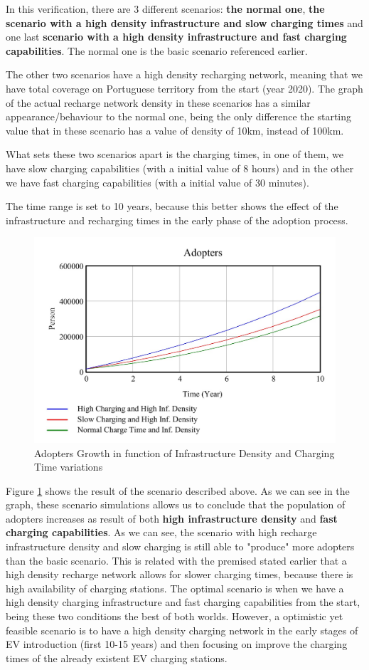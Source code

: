 In this verification, there are 3 different scenarios: \textbf{the normal one}, \textbf{the scenario with a high density infrastructure and slow charging times} and one last \textbf{scenario with a high density infrastructure and fast charging capabilities}. The normal one is the basic scenario referenced earlier.

The other two scenarios have a high density recharging network, meaning that we have total coverage on Portuguese territory from the start (year 2020). The graph of the actual recharge network density in these scenarios has a similar appearance/behaviour to the normal one, being the only difference the starting value that in these scenario has a value of density of 10km, instead of 100km.

What sets these two scenarios apart is the charging times, in one of them, we have slow charging capabilities (with a initial value of 8 hours) and in the other we have fast charging capabilities (with a initial value of 30 minutes).

The time range is set to 10 years, because this better shows the effect of the infrastructure and recharging times in the early phase of the adoption process.

\begin{figure}[htbp]
\centerline{\includegraphics[width=0.7\linewidth]{img/results-time-and-density.jpg}}
\caption{Adopters Growth in function of Infrastructure Density and Charging Time variations}
\label{fig:results-time-and-density}
\end{figure}

Figure \ref{fig:results-time-and-density} shows the result of the scenario described above. As we can see in the graph, these scenario simulations allows us to conclude that the population of adopters increases as result of both \textbf{high infrastructure density} and \textbf{fast charging capabilities}. As we can see, the scenario with high recharge infrastructure density and slow charging is still able to "produce" more adopters than the basic scenario. This is related with the premised stated earlier that a high density recharge network allows for slower charging times, because there is high availability of charging stations. The optimal scenario is when we have a high density charging infrastructure and fast charging capabilities from the start, being these two conditions the best of both worlds. However, a optimistic yet feasible scenario is to have a high density charging network in the early stages of EV introduction (first 10-15 years) and then focusing on improve the charging times of the already existent EV charging stations.

\clearpage
